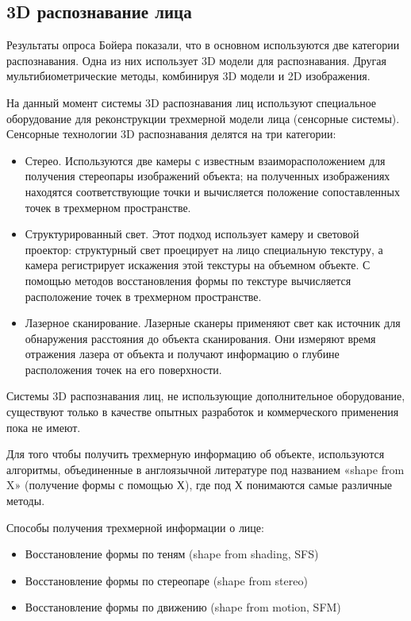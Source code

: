\documentclass[12pt,a4paper]{article}					%
\begin{document}

\subsection{3D распознавание лица}

Результаты опроса Бойера показали, что в основном используются две категории распознавания.
Одна из них использует 3D модели для распознавания.
Другая мультибиометрические методы, комбинируя 3D модели и 2D изображения.

На данный момент системы 3D распознавания лиц используют специальное оборудование для реконструкции трехмерной модели лица (сенсорные системы). Сенсорные технологии 3D распознавания делятся на три категории: 

\begin{itemize}
\item Стерео. Используются две камеры с известным взаиморасположением для получения стереопары изображений объекта; на полученных изображениях находятся соответствующие точки и вычисляется положение сопоставленных точек в трехмерном пространстве. 
\item Структурированный свет. Этот подход использует камеру и световой проектор: структурный свет проецирует на лицо специальную текстуру, а камера регистрирует искажения этой текстуры на объемном объекте. С помощью методов восстановления формы по текстуре вычисляется расположение точек в  трехмерном пространстве. 
\item Лазерное сканирование. Лазерные сканеры применяют свет как источник для обнаружения расстояния до объекта сканирования. Они измеряют время отражения лазера от объекта и получают информацию о глубине расположения точек на его поверхности.
\end{itemize}

Системы 3D распознавания лиц, не использующие дополнительное оборудование, существуют только в качестве опытных разработок и коммерческого применения пока не имеют. 

Для того чтобы получить трехмерную информацию об объекте, используются алгоритмы, объединенные в англоязычной литературе под названием «shape from X» (получение формы с помощью Х), где под Х понимаются самые различные методы.

Способы получения трехмерной информации о лице:
\begin{itemize}
\item Восстановление формы по теням (shape from shading, SFS)
\item Восстановление формы по стереопаре (shape from stereo)
\item Восстановление формы по движению (shape from motion, SFM)
\end{itemize}
\end{document}
